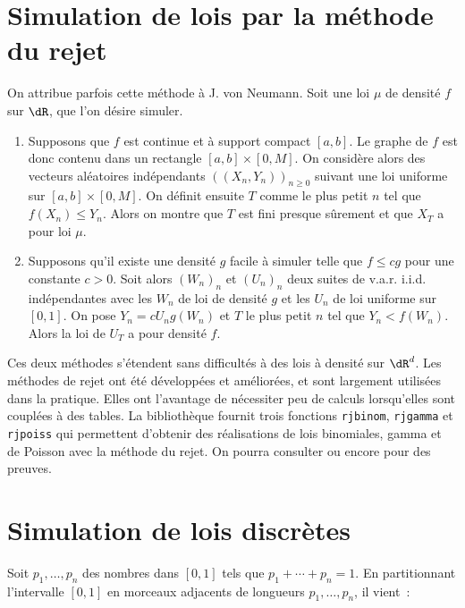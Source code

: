 %
\section{Simulation de lois par la méthode du rejet}
%

On attribue parfois cette méthode à J. von Neumann. Soit une loi $\mu$ de
densité $f$ sur $\dR$, que l'on désire simuler.

\begin{enumerate}
\item Supposons que $f$ est continue et à support compact $[a,b]$. Le graphe
  de $f$ est donc contenu dans un rectangle $[a,b]\times[0,M]$. On considère alors
  des vecteurs aléatoires indépendants $((X_n,Y_n))_{n\geq0}$ suivant une loi
  uniforme sur $[a,b]\times[0,M]$. On définit ensuite $T$ comme le plus petit $n$
  tel que $f(X_n) \leq Y_n$. Alors on montre que $T$ est fini presque sûrement et
  que $X_T$ a pour loi $\mu$.
\item Supposons qu'il existe une densité $g$ facile à simuler telle que $f\leq c
  g$ pour une constante $c>0$. Soit alors $(W_n)_n$ et $(U_n)_n$ deux suites
  de v.a.r. i.i.d. indépendantes avec les $W_n$ de loi de densité $g$ et les
  $U_n$ de loi uniforme sur $[0,1]$.  On pose $Y_n=cU_ng(W_n)$ et $T$ le plus
  petit $n$ tel que $Y_n<f(W_n)$. Alors la loi de $U_{T}$ a pour densité $f$.
\end{enumerate}
Ces deux méthodes s'étendent sans difficultés à des lois à densité sur
$\dR^d$. Les méthodes de rejet ont été développées et améliorées, et sont
largement utilisées dans la pratique. Elles ont l'avantage de nécessiter peu
de calculs lorsqu'elles sont couplées à des tables. La bibliothèque \SB{}
fournit trois fonctions \texttt{rjbinom}, \texttt{rjgamma} et \texttt{rjpoiss}
qui permettent d'obtenir des réalisations de lois binomiales, gamma et de
Poisson avec la méthode du rejet. On pourra consulter \cite[IV.4.3, p.
79]{bouleau} ou encore \cite[VI.5.15, p. 180]{barbe-ledoux} pour des preuves.

%
\section{Simulation de lois discrètes}
%

Soit $p_1,\ldots,p_n$ des nombres dans $[0,1]$ tels que $p_1+\cdots+p_n=1$. En
partitionnant l'intervalle $[0,1]$ en morceaux adjacents de longueurs
$p_1,\ldots,p_n$, il vient~:


